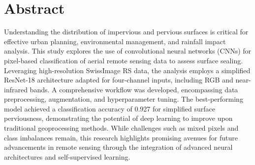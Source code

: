 

\vspace*{\fill}

\section*{Abstract}
\label{abstract}

Understanding the distribution of impervious and pervious surfaces is critical 
for effective urban planning, environmental management, and rainfall impact analysis. 
This study explores the use of convolutional neural networks (CNNs) for 
pixel-based classification of aerial remote sensing data to assess surface sealing. 
Leveraging high-resolution SwissImage RS data, the analysis employs a simplified 
ResNet-18 architecture adapted for four-channel inputs, including RGB and 
near-infrared bands. A comprehensive workflow was developed, encompassing 
data preprocessing, augmentation, and hyperparameter tuning. The best-performing 
model achieved a classification accuracy of 0.927 for simplified surface perviousness, 
demonstrating the potential of deep learning to improve upon traditional 
geoprocessing methods. While challenges such as mixed pixels and class imbalances remain, 
this research highlights promising avenues for future advancements 
in remote sensing through the integration of advanced neural architectures and self-supervised learning.

\vspace*{\fill}